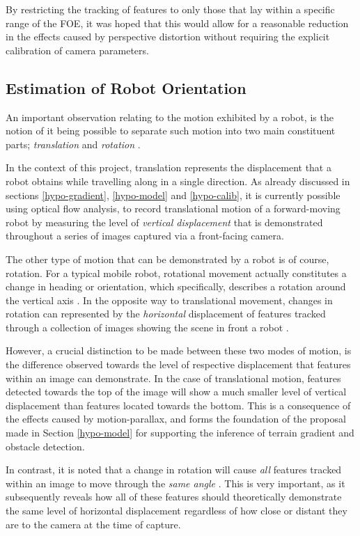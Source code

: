By restricting the tracking of features to only those that lay within a specific range of the FOE, it was hoped that this would allow for a reasonable reduction in the effects caused by perspective distortion without requiring the explicit calibration of camera parameters. 

\subsection{Estimation of Robot Orientation}
\label{hypo-rotation}
An important observation relating to the motion exhibited by a robot, is the notion of it being possible to separate such motion into two main constituent parts; \textit{translation} and \textit{rotation} \cite{campbell}. 

In the context of this project, translation represents the displacement that a robot obtains while travelling along in a single direction. As already discussed in sections \ref{hypo-gradient}, \ref{hypo-model} and \ref{hypo-calib}, it is currently possible using optical flow analysis, to record translational motion of a forward-moving robot by measuring the level of \textit{vertical displacement} that is demonstrated throughout a series of images captured via a front-facing camera.

The other type of motion that can be demonstrated by a robot is of course, rotation. For a typical mobile robot, rotational movement actually constitutes a change in heading or orientation, which specifically, describes a rotation around the vertical axis \cite{campbell}. In the opposite way to translational movement, changes in rotation can represented by the \textit{horizontal} displacement of features tracked through a collection of images showing the scene in front a robot \cite{labrosse}. 

However, a crucial distinction to be made between these two modes of motion, is the difference observed towards the level of respective displacement that features within an image can demonstrate. In the case of translational motion, features detected towards the top of the image will show a much smaller level of vertical displacement than features located towards the bottom. This is a consequence of the effects caused by motion-parallax, and forms the foundation of the proposal made in Section \ref{hypo-model} for supporting the inference of terrain gradient and obstacle detection. 

In contrast, it is noted that a change in rotation will cause \textit{all} features tracked within an image to move through the \textit{same angle} \cite{campbell}. This is very important, as it subsequently reveals how all of these features should theoretically demonstrate the same level of horizontal displacement regardless of how close or distant they are to the camera at the time of capture.

